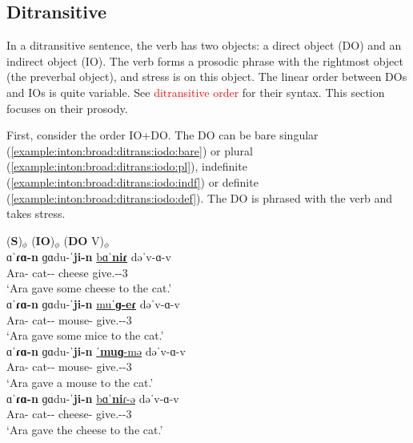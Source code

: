 \subsection{Ditransitive}\label{section:intonation:broadFocus:ditrans}
In a ditransitive sentence, the verb has two objects: a direct object (DO) and an indirect object (IO). The verb forms a prosodic phrase with the rightmost object (the preverbal object), and stress is on this object. The linear order between DOs and IOs is quite variable. See \textcolor{red}{ditransitive order} for their syntax. This section focuses on their prosody. 


First, consider the order IO+DO. The DO can be bare singular (\ref{example:inton:broad:ditrans:iodo:bare}) or plural (\ref{example:inton:broad:ditrans:iodo:pl}), indefinite (\ref{example:inton:broad:ditrans:iodo:indf}) or definite (\ref{example:inton:broad:ditrans:iodo:def}). The DO is phrased with the verb and takes stress. 

\begin{exe}
	\ex \begin{xlist}
		\ex \glll (\textbf{S})$_\phi$ (\textbf{IO})$_\phi$ (\textbf{DO} V)$_\phi$ \\
		ɑˈ\textbf{ɾɑ-n} ɡɑdu-ˈ\textbf{ji-n} \underline{bɑˈ\textbf{niɾ}}  dəˈv-ɑ-v \\
		Ara-{} cat-{\dat}-{} cheese give.{\aorperf}-{\pst}-3{\sg}  \\
		\trans `Ara gave some cheese to the cat.' \label{example:inton:broad:ditrans:iodo:bare}
		\\ 
		\ex \gll ɑˈ\textbf{ɾɑ-n} ɡɑdu-ˈ\textbf{ji-n} \underline{muˈ\textbf{ɡ-eɾ}}  dəˈv-ɑ-v \\
		Ara-{} cat-{\dat}-{} mouse-{\pl} give.{\aorperf}-{\pst}-3{\sg}  \\
		\trans `Ara gave some mice to the cat.' \label{example:inton:broad:ditrans:iodo:pl}
		\\ 
		\ex \gll ɑˈ\textbf{ɾɑ-n} ɡɑdu-ˈ\textbf{ji-n} \underline{ˈ\textbf{muɡ}-mə}  dəˈv-ɑ-v \\
		Ara-{} cat-{\dat}-{} mouse-{\indf} give.{\aorperf}-{\pst}-3{\sg}  \\
		\trans `Ara gave a mouse to the cat.'\label{example:inton:broad:ditrans:iodo:indf}
		\\ 
		\ex \gll ɑˈ\textbf{ɾɑ-n} ɡɑdu-ˈ\textbf{ji-n} \underline{bɑˈ\textbf{ni}ɾ-ə}  dəˈv-ɑ-v \\
		Ara-{} cat-{\dat}-{} cheese-{} give.{\aorperf}-{\pst}-3{\sg}  \\
		\trans `Ara gave the cheese to the cat.'\label{example:inton:broad:ditrans:iodo:def}
		\\ 
	\end{xlist}
\end{exe}

